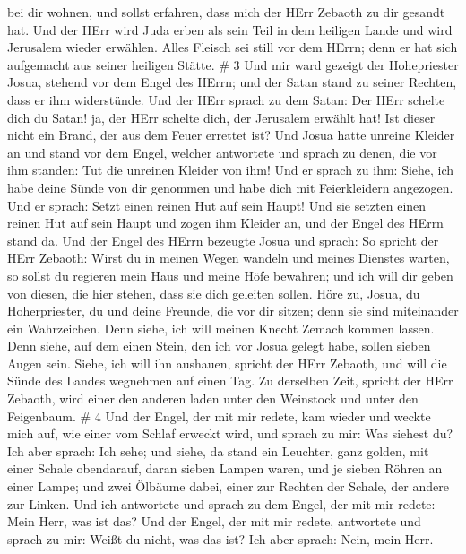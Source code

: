 bei dir wohnen, und sollst erfahren, dass mich der HErr Zebaoth zu dir
gesandt hat.  Und der HErr wird Juda erben als sein Teil in
dem heiligen Lande und wird Jerusalem wieder erwählen. 
Alles Fleisch sei still vor dem HErrn; denn er hat sich aufgemacht aus
seiner heiligen Stätte. \# 3  Und mir ward gezeigt der
Hohepriester Josua, stehend vor dem Engel des HErrn; und der Satan stand
zu seiner Rechten, dass er ihm widerstünde.  Und der HErr
sprach zu dem Satan: Der HErr schelte dich du Satan! ja, der HErr
schelte dich, der Jerusalem erwählt hat! Ist dieser nicht ein Brand, der
aus dem Feuer errettet ist?  Und Josua hatte unreine Kleider
an und stand vor dem Engel,  welcher antwortete und sprach
zu denen, die vor ihm standen: Tut die unreinen Kleider von ihm! Und er
sprach zu ihm: Siehe, ich habe deine Sünde von dir genommen und habe
dich mit Feierkleidern angezogen.  Und er sprach: Setzt
einen reinen Hut auf sein Haupt! Und sie setzten einen reinen Hut auf
sein Haupt und zogen ihm Kleider an, und der Engel des HErrn stand da.
 Und der Engel des HErrn bezeugte Josua und sprach:
 So spricht der HErr Zebaoth: Wirst du in meinen Wegen
wandeln und meines Dienstes warten, so sollst du regieren mein Haus und
meine Höfe bewahren; und ich will dir geben von diesen, die hier stehen,
dass sie dich geleiten sollen.  Höre zu, Josua, du
Hoherpriester, du und deine Freunde, die vor dir sitzen; denn sie sind
miteinander ein Wahrzeichen. Denn siehe, ich will meinen Knecht Zemach
kommen lassen.  Denn siehe, auf dem einen Stein, den ich vor
Josua gelegt habe, sollen sieben Augen sein. Siehe, ich will ihn
aushauen, spricht der HErr Zebaoth, und will die Sünde des Landes
wegnehmen auf einen Tag.  Zu derselben Zeit, spricht der
HErr Zebaoth, wird einer den anderen laden unter den Weinstock und unter
den Feigenbaum. \# 4  Und der Engel, der mit mir redete, kam
wieder und weckte mich auf, wie einer vom Schlaf erweckt wird,
 und sprach zu mir: Was siehest du? Ich aber sprach: Ich
sehe; und siehe, da stand ein Leuchter, ganz golden, mit einer Schale
obendarauf, daran sieben Lampen waren, und je sieben Röhren an einer
Lampe;  und zwei Ölbäume dabei, einer zur Rechten der
Schale, der andere zur Linken.  Und ich antwortete und
sprach zu dem Engel, der mit mir redete: Mein Herr, was ist das?
 Und der Engel, der mit mir redete, antwortete und sprach zu
mir: Weißt du nicht, was das ist? Ich aber sprach: Nein, mein Herr.
